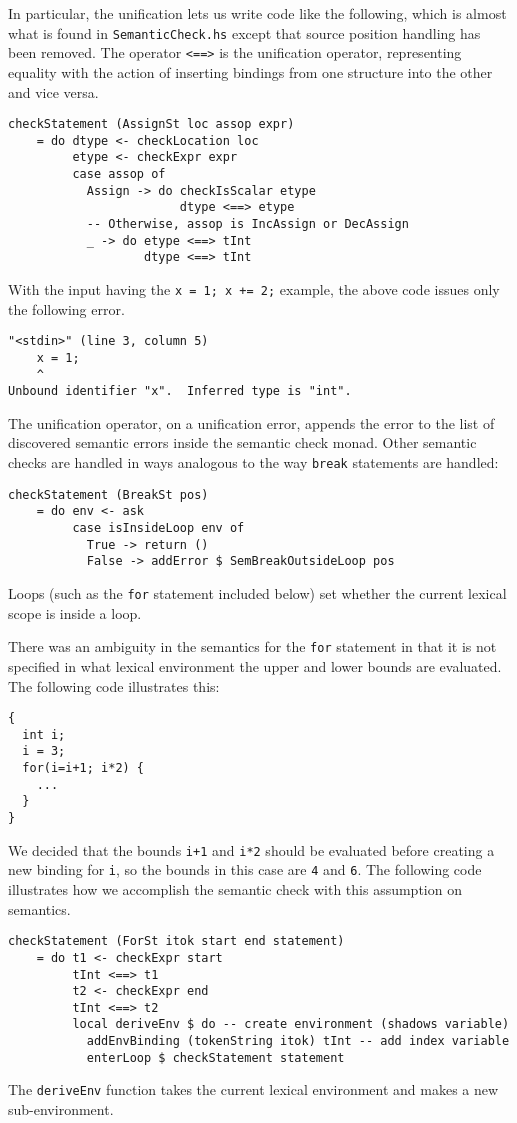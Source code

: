 \documentclass[11pt]{article}
\begin{document}
In particular, the unification lets us write code like the following,
which is almost what is found in \texttt{SemanticCheck.hs} except that
source position handling has been removed.  The operator \texttt{<==>}
is the unification operator, representing equality with the action of
inserting bindings from one structure into the other and vice versa.

\begin{verbatim}
checkStatement (AssignSt loc assop expr)
    = do dtype <- checkLocation loc
         etype <- checkExpr expr
         case assop of
           Assign -> do checkIsScalar etype
                        dtype <==> etype
           -- Otherwise, assop is IncAssign or DecAssign
           _ -> do etype <==> tInt
                   dtype <==> tInt
\end{verbatim}

With the input having the \texttt{x = 1; x += 2;} example, the above
code issues only the following error.
\begin{verbatim}
"<stdin>" (line 3, column 5)
    x = 1;
    ^
Unbound identifier "x".  Inferred type is "int".
\end{verbatim}

The unification operator, on a unification error, appends the error to
the list of discovered semantic errors inside the semantic check
monad.  Other semantic checks are handled in ways analogous to the way
\texttt{break} statements are handled:
\begin{verbatim}
checkStatement (BreakSt pos)
    = do env <- ask
         case isInsideLoop env of
           True -> return ()
           False -> addError $ SemBreakOutsideLoop pos
\end{verbatim}%
Loops (such as the \texttt{for} statement included below) set whether
the current lexical scope is inside a loop.

There was an ambiguity in the semantics for the \texttt{for} statement
in that it is not specified in what lexical environment the upper and
lower bounds are evaluated.  The following code illustrates this:
\begin{verbatim}
{
  int i;
  i = 3;
  for(i=i+1; i*2) {
    ...
  }
}
\end{verbatim}

We decided that the bounds \texttt{i+1} and \texttt{i*2} should be
evaluated before creating a new binding for \texttt{i}, so the bounds
in this case are \texttt{4} and \texttt{6}.  The following code
illustrates how we accomplish the semantic check with this assumption
on semantics.
\begin{verbatim}
checkStatement (ForSt itok start end statement)
    = do t1 <- checkExpr start
         tInt <==> t1
         t2 <- checkExpr end
         tInt <==> t2
         local deriveEnv $ do -- create environment (shadows variable)
           addEnvBinding (tokenString itok) tInt -- add index variable
           enterLoop $ checkStatement statement
\end{verbatim}
The \texttt{deriveEnv} function takes the current lexical environment
and makes a new sub-environment.
\end{document}
